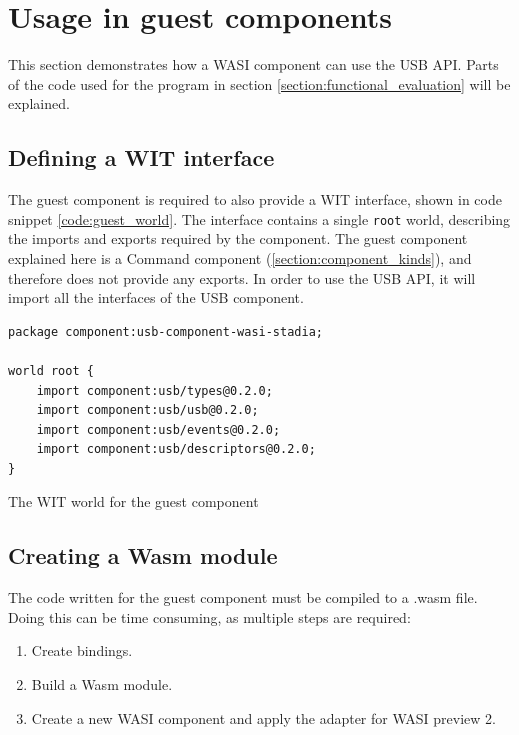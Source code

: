 \section{Usage in guest components}
This section demonstrates how a \acrshort{WASI} component can use the \acrshort{USB} \acrshort{API}. Parts of the code used for the program in section \ref{section:functional_evaluation} will be explained.

\subsection{Defining a \acrshort{WIT} interface}
The guest component is required to also provide a \acrshort{WIT} interface, shown in code snippet \ref{code:guest_world}. The interface contains a single \texttt{root} world, describing the imports and exports required by the component. The guest component explained here is a Command component (\ref{section:component_kinds}), and therefore does not provide any exports. In order to use the \acrshort{USB} \acrshort{API}, it will import all the interfaces of the \acrshort{USB} component.\\

\begin{code}
\begin{verbatim}
package component:usb-component-wasi-stadia;

world root {
	import component:usb/types@0.2.0;
	import component:usb/usb@0.2.0;
	import component:usb/events@0.2.0;
	import component:usb/descriptors@0.2.0;
}
\end{verbatim} 
\caption{The \acrshort{WIT} world for the guest component}
\label{code:guest_world}
\end{code}

\subsection{Creating a \acrshort{Wasm} module}
The code written for the guest component must be compiled to a .wasm file. Doing this can be time consuming, as multiple steps are required:

\begin{enumerate}
\item Create bindings.
\item Build a \acrshort{Wasm} module.
\item Create a new \acrshort{WASI} component and apply the adapter for \acrshort{WASI} preview 2.
\end{enumerate}

